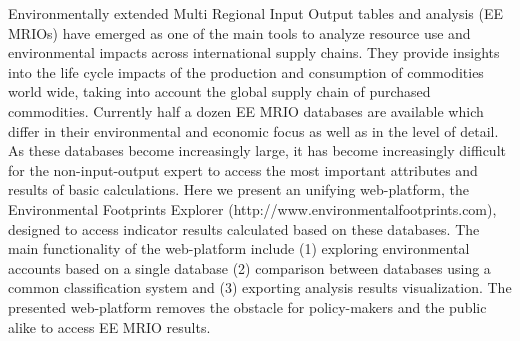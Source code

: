 Environmentally extended Multi Regional Input Output tables and analysis (EE MRIOs) have emerged as one of the main tools to analyze resource use and environmental impacts across international supply chains. They provide insights into the life cycle impacts of the production and consumption of commodities world wide, taking into account the global supply chain of purchased commodities. Currently half a dozen EE MRIO databases are available which differ in their environmental and economic focus as well as in the level of detail. As these databases become increasingly large, it has become increasingly difficult for the non-input-output expert to access the most important attributes and results of basic calculations. Here we present an unifying web-platform, the Environmental Footprints Explorer (http://www.environmentalfootprints.com), designed to access indicator results calculated based on these databases. The main functionality of the web-platform include (1) exploring environmental accounts based on a single database (2) comparison between databases using a common classification system and (3) exporting analysis results visualization. The presented web-platform removes the obstacle for policy-makers and the public alike to access EE MRIO results. 

